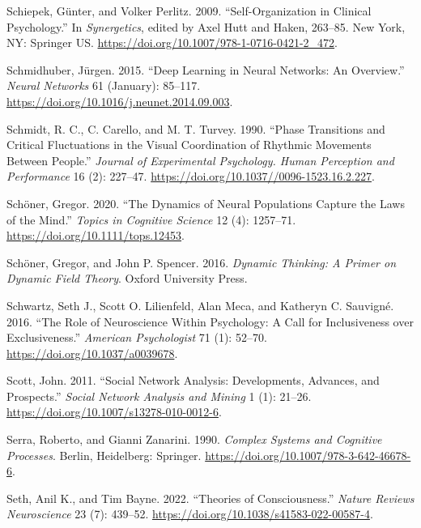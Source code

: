 \documentclass[
  a4paper,
  DIV=11,
  numbers=noendperiod,
  oneside]{scrreprt}
\newlength{\cslhangindent}
\newenvironment{CSLReferences}[2] %
 {\begin{list}{}{%
  \setlength{\itemindent}{0pt}
  \setlength{\leftmargin}{0pt}
  \setlength{\parsep}{0pt}
  \ifodd #1
   \setlength{\leftmargin}{\cslhangindent}
   \setlength{\itemindent}{-1\cslhangindent}
  \fi
  \setlength{\itemsep}{#2\baselineskip}}}
 {\end{list}}
\begin{document}
\begin{CSLReferences}{1}{0}
Schiepek, Günter, and Volker Perlitz. 2009. {``Self-{Organization} in
{Clinical Psychology}.''} In \emph{Synergetics}, edited by Axel Hutt and
Haken, 263--85. {New York, NY}: {Springer US}.
\url{https://doi.org/10.1007/978-1-0716-0421-2_472}.

Schmidhuber, Jürgen. 2015. {``Deep Learning in Neural Networks: {An}
Overview.''} \emph{Neural Networks} 61 (January): 85--117.
\url{https://doi.org/10.1016/j.neunet.2014.09.003}.

Schmidt, R. C., C. Carello, and M. T. Turvey. 1990. {``Phase Transitions
and Critical Fluctuations in the Visual Coordination of Rhythmic
Movements Between People.''} \emph{Journal of Experimental Psychology.
Human Perception and Performance} 16 (2): 227--47.
\url{https://doi.org/10.1037//0096-1523.16.2.227}.

Schöner, Gregor. 2020. {``The {Dynamics} of {Neural Populations Capture}
the {Laws} of the {Mind}.''} \emph{Topics in Cognitive Science} 12 (4):
1257--71. \url{https://doi.org/10.1111/tops.12453}.

Schöner, Gregor, and John P. Spencer. 2016. \emph{Dynamic Thinking: {A}
Primer on Dynamic Field Theory}. {Oxford University Press}.

Schwartz, Seth J., Scott O. Lilienfeld, Alan Meca, and Katheryn C.
Sauvigné. 2016. {``The Role of Neuroscience Within Psychology: A Call
for Inclusiveness over Exclusiveness.''} \emph{American Psychologist} 71
(1): 52--70. \url{https://doi.org/10.1037/a0039678}.

Scott, John. 2011. {``Social Network Analysis: Developments, Advances,
and Prospects.''} \emph{Social Network Analysis and Mining} 1 (1):
21--26. \url{https://doi.org/10.1007/s13278-010-0012-6}.

Serra, Roberto, and Gianni Zanarini. 1990. \emph{Complex {Systems} and
{Cognitive Processes}}. {Berlin, Heidelberg}: {Springer}.
\url{https://doi.org/10.1007/978-3-642-46678-6}.

Seth, Anil K., and Tim Bayne. 2022. {``Theories of Consciousness.''}
\emph{Nature Reviews Neuroscience} 23 (7): 439--52.
\url{https://doi.org/10.1038/s41583-022-00587-4}.


\end{CSLReferences}
\end{document}

